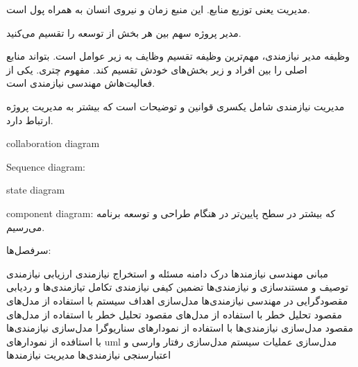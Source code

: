 مدیریت یعنی توزیع منابع. این منبع زمان و نیروی انسان به همراه پول است.

مدیر پروژه سهم بین هر بخش از توسعه را تقسیم می‌کنید.

وظیفه مدیر نیازمندی، مهم‌ترین وظیفه تقسیم وظایف به زیر عوامل است. بتواند منابع
اصلی را بین افراد و زیر بخش‌های خودش تقسیم کند. مفهوم چتری. یکی از فعالیت‌هاش
مهندسی نیازمندی است.

مدیریت نیازمندی شامل یکسری قوانین و توضیحات است که بیشتر به مدیریت پروژه ارتباط
دارد.

collaboration diagram

Sequence diagram: 

state diagram

component diagram: که بیشتر در سطح پایین‌تر در هنگام طراحی و توسعه برنامه
می‌رسیم.

سرفصل‌ها:

مبانی مهندسی نیازمند‌ها
درک دامنه مسئله و استخراج نیازمندی
ارزیابی نیازمندی
توصیف و مستندسازی و نیازمندی‌ها
تضمین کیفی نیازمندی
تکامل تیازمندی‌ها و ردیابی
مقصودگرایی در مهندسی نیازمندی‌ها
مدل‌سازی اهداف سیستم با استفاده از مدل‌های مقصود
تحلیل خطر با استفاده از مدل‌های مقصود
تحلیل خطر با استفاده از مدل‌های مقصود
مدل‌سازی نیازمندی‌ها با استفاده از نمودار‌های سناریوگرا
مدل‌سازی نیازمندی‌ها با استافده از نمودار‌های uml
مدل‌سازی عملیات سیستم
مدل‌سازی رفتار
وارسی و اعتبارسنجی نیازمندی‌ها
مدیریت نیازمند‌ها